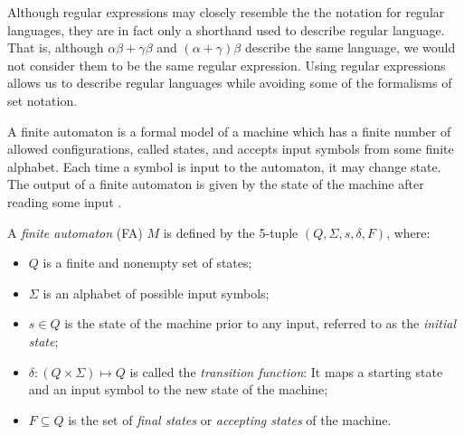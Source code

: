 \documentclass{bcthesis}
\renewcommand{\meo}[1]{}
\newcommand{\footcite}[2]{\xspace\cite[pg.~{#2}]{#1}\xspace}
\begin{document}
	\begin{remark}
		Although regular expressions may closely resemble the the notation for regular languages, they are in fact only a shorthand used to describe regular language. 
		That is, although $\alpha \beta + \gamma \beta$ and $(\alpha + \gamma) \beta$ describe the same language, we would not consider them to be the same regular expression.
		Using regular expressions allows us to describe regular languages while avoiding some of the formalisms of set notation.
		\meo{
			Is this a convincing reason why this is a thing worth having?
			Maybe mention that a language is regular if and only if it can be described by a regular expression.
		}

	\end{remark}

	\meo{
		I could mention here that regular expressions are an example of a grammar, shockingly belonging to the class of regular grammars.
	}


\label{ch:finite_automata}

	A finite automaton is a formal model of a machine which has a finite number of allowed configurations, called states, and accepts input symbols from some finite alphabet. 
	Each time a symbol is input to the automaton, it may change state. 
	The output of a finite automaton is given by the state of the machine after reading some input \footcite{hopcroft}{13}.

	\begin{definition}
		A \textit{finite automaton} (FA) $M$ is defined by the 5-tuple $(Q, \Sigma, s, \delta, F)$, where:
		\begin{itemize}
			\item [] $Q$ is a finite and nonempty set of states;
			\item [] $\Sigma$ is an alphabet of possible input symbols;
			\item [] $s \in Q$ is the state of the machine prior to any input, referred to as the \textit{initial state};
			\item [] $\delta: (Q \times \Sigma) \mapsto Q$ is called the \textit{transition function}: It maps a starting state and an input symbol to the new state of the machine;
			\item [] $F \subseteq Q$ is the set of \textit{final states} or \textit{accepting states} of the machine.
		\end{itemize}
		\footcite{hopcroft}{17}~\meo{todo: something about this citation}
	\end{definition}
\end{document}
